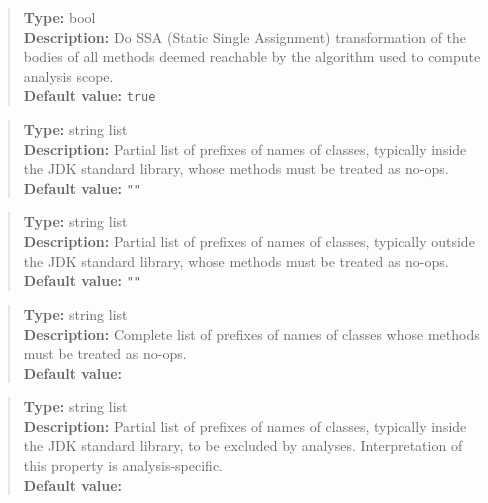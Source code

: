 \begin{quote}
{\bf Type:} bool  \\
{\bf Description:} Do SSA (Static Single Assignment) transformation of the bodies of all methods deemed reachable by the algorithm used to compute analysis scope. \\
{\bf Default value:} {\tt true}
\end{quote}


\begin{quote}
{\bf Type:} string list \\
{\bf Description:} Partial list of prefixes of names of classes, typically inside the JDK standard library, whose methods must be treated as no-ops. \\
{\bf Default value:} {\tt ""}
\end{quote}

\begin{quote}
{\bf Type:} string list \\
{\bf Description:} Partial list of prefixes of names of classes, typically outside the JDK standard library, whose methods must be treated as no-ops. \\
{\bf Default value:} {\tt ""}
\end{quote}

\begin{quote}
{\bf Type:} string list \\
{\bf Description:} Complete list of prefixes of names of classes whose methods must be treated as no-ops. \\
{\bf Default value:} 
\end{quote}

\begin{quote}
{\bf Type:} string list \\
{\bf Description:} Partial list of prefixes of names of classes, typically inside the JDK standard library, to be excluded by analyses.  Interpretation of this property is analysis-specific. \\
{\bf Default value:}  
\end{quote}

